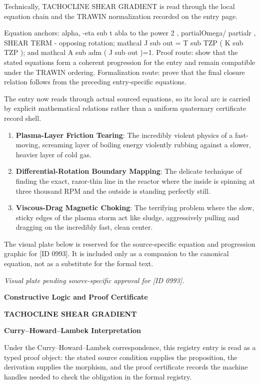 Technically, TACHOCLINE SHEAR GRADIENT is read through the local equation chain and the TRAWIN normalization recorded on the entry page.

Equation anchors: alpha, -eta sub t abla to the power 2 , partialOmega/ partialr , SHEAR TERM - opposing rotation; mathcal J sub out = T sub TZP ( K sub TZP ); and mathcal A sub adm ( J sub out )=1. Proof route: show that the stated equations form a coherent progression for the entry and remain compatible under the TRAWIN ordering. Formalization route: prove that the final closure relation follows from the preceding entry-specific equations.

The entry now reads through actual sourced equations, so its local arc is carried by explicit mathematical relations rather than a uniform quaternary certificate record shell.
\endgroup

\begin{enumerate}[leftmargin=1.6em,itemsep=6pt,topsep=4pt]
\item \textbf{Plasma-Layer Friction Tearing}: The incredibly violent physics of a fast-moving, screaming layer of boiling energy violently rubbing against a slower, heavier layer of cold gas.
\item \textbf{Differential-Rotation Boundary Mapping}: The delicate technique of finding the exact, razor-thin line in the reactor where the inside is spinning at three thousand RPM and the outside is standing perfectly still.
\item \textbf{Viscous-Drag Magnetic Choking}: The terrifying problem where the slow, sticky edges of the plasma storm act like sludge, aggressively pulling and dragging on the incredibly fast, clean center.
\end{enumerate}

\begingroup\footnotesize\sloppy
The visual plate below is reserved for the source-specific equation and progression graphic for [ID 0993]. It is included only as a companion to the canonical equation, not as a substitute for the formal text.
\par\endgroup
\begingroup\footnotesize\itshape
Visual plate pending source-specific approval for [ID 0993].
\par\endgroup

\clearpage
\begingroup\tzpsupportsetup
\noindent\textbf{\fontsize{10.8pt}{12.8pt}\selectfont [ID 0993] Constructive Logic and Proof Certificate}\par
\noindent\textbf{\fontsize{10pt}{12pt}\selectfont TACHOCLINE SHEAR GRADIENT}\par
\vspace{0.45em}
\begingroup
\footnotesize
\setlength{\parskip}{0.22em}
\setlength{\parindent}{0pt}
\noindent\textbf{Curry--Howard--Lambek Interpretation}\par
Under the Curry--Howard--Lambek correspondence, this registry entry is read as a typed proof
object: the stated source condition supplies the proposition, the derivation supplies the
morphism, and the proof certificate records the machine handles needed to check the obligation
in the formal registry.

